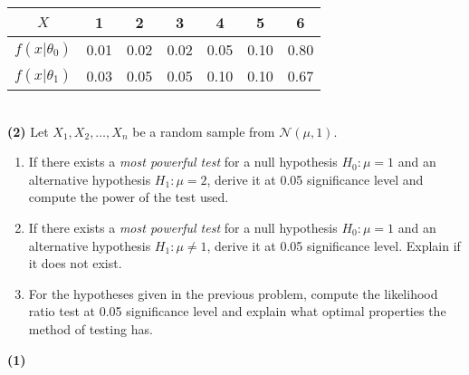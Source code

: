 \documentclass[answers]{exam}
\begin{document}
\begin{questions}
\begin{table}[!htbp]
\begin{tabular}{*7c}
          $X$ & 1 & 2 & 3 & 4 & 5 & 6\\
          \midrule
          $f\left(x|\theta_{0}\right)$ & 0.01 & 0.02 & 0.02 & 0.05 & 0.10 & 0.80\\
          $f\left(x|\theta_{1}\right)$ & 0.03 & 0.05 & 0.05 & 0.10 & 0.10 & 0.67\\
          \bottomrule
        \end{tabular}
      \end{table}\\
      \textbf{(2)} Let $X_{1}, X_{2}, \ldots , X_{n}$ be a random sample from $\mathcal{N}\left(\mu,1\right)$.
      \begin{enumerate}[label=(\alph*)]
         \item If there exists a \emph{most powerful test} for a null hypothesis $H_{0}: \mu = 1$ and an alternative hypothesis $H_{1}:\mu=2$, derive it at 0.05 significance level and compute the power of the test used.
         \item If there exists a \emph{most powerful test} for a null hypothesis $H_{0}: \mu =1$ and an alternative hypothesis $H_{1}:\mu\neq 1$, derive it at 0.05 significance level. Explain if it does not exist.
         \item For the hypotheses given in the previous problem, compute the likelihood ratio test at 0.05 significance level and explain what optimal properties the method of testing has.
      \end{enumerate}
      \begin{solution}
         \textbf{(1)} 
      \end{solution}
\end{questions}
\end{document}
